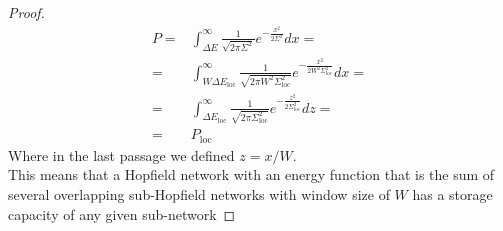 \documentclass{article}
\newtheorem{theorem}{Theorem}[section]
\theoremstyle{definition}
\theoremstyle{remark}
\begin{document}
\begin{proof}
        \begin{equation}
        \begin{split}
            P=&\int_{\Delta E}^\infty\frac 1{\sqrt{2\pi\Sigma^2}}e^{-\frac{x^2}{2\Sigma^2}}dx=\\
            =& \int_{W\Delta E_\textrm{loc}}^\infty\frac 1{\sqrt{2\pi W^2\Sigma_\textrm{loc}^2}}e^{-\frac{x^2}{2W^2\Sigma_\textrm{loc}^2}}dx=\\
            =&\int_{\Delta E_\textrm{loc}}^\infty\frac 1{\sqrt{2\pi \Sigma_\textrm{loc}^2}}e^{-\frac{z^2}{2\Sigma_\textrm{loc}^2}}dz=\\
            =&P_\textrm{loc}
        \end{split}
        \end{equation}
        Where in the last passage we defined $z=x/W$.\\
        This means that a Hopfield network with an energy function that is the sum of several overlapping sub-Hopfield networks with window size of $W$ has a storage capacity of any given sub-network
    \end{proof}
    


\newpage
\printbibliography
\end{document}
